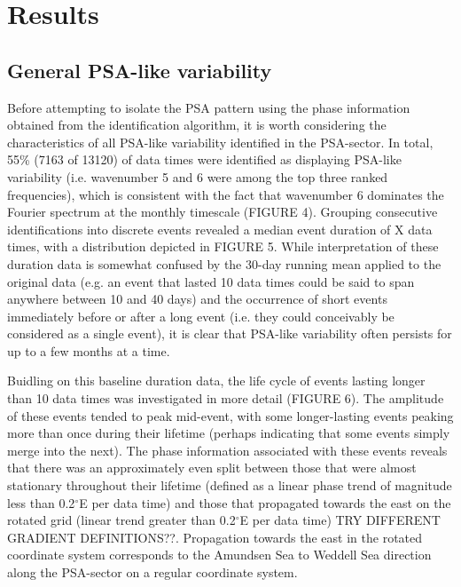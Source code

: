 \section{Results}

\subsection{General PSA-like variability}

Before attempting to isolate the PSA pattern using the phase information obtained from the identification algorithm, it is worth considering the characteristics of all PSA-like variability identified in the PSA-sector. In total, 55\% (7163 of 13120) of data times were identified as displaying PSA-like variability (i.e. wavenumber 5 and 6 were among the top three ranked frequencies), which is consistent with the fact that wavenumber 6 dominates the Fourier spectrum at the monthly timescale (FIGURE 4). Grouping consecutive identifications into discrete events revealed a median event duration of X data times, with a distribution depicted in FIGURE 5. While interpretation of these duration data is somewhat confused by the 30-day running mean applied to the original data (e.g. an event that lasted 10 data times could be said to span anywhere between 10 and 40 days) and the occurrence of short events immediately before or after a long event (i.e. they could conceivably be considered as a single event), it is clear that PSA-like variability often persists for up to a few months at a time.     

Buidling on this baseline duration data, the life cycle of events lasting longer than 10 data times was investigated in more detail (FIGURE 6). The amplitude of these events tended to peak mid-event, with some longer-lasting events peaking more than once during their lifetime (perhaps indicating that some events simply merge into the next). The phase information associated with these events reveals that there was an approximately even split between those that were almost stationary throughout their lifetime (defined as a linear phase trend of magnitude less than 0.2$^{\circ}$E per data time) and those that propagated towards the east on the rotated grid (linear trend greater than 0.2$^{\circ}$E per data time) TRY DIFFERENT GRADIENT DEFINITIONS??. Propagation towards the east in the rotated coordinate system corresponds to the Amundsen Sea to Weddell Sea direction along the PSA-sector on a regular coordinate system. 

